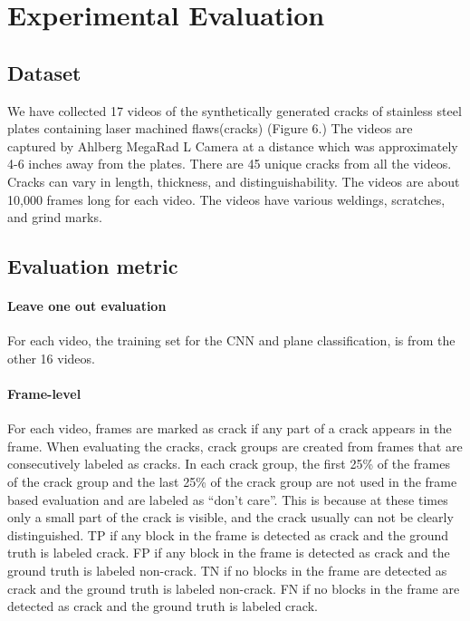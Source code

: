 \section{Experimental Evaluation}

    \subsection{Dataset}
        We have collected 17 videos of the synthetically generated cracks of stainless steel plates containing laser machined flaws(cracks) (Figure 6.) The videos are captured by Ahlberg MegaRad L Camera at a distance which was approximately 4-6 inches away from the plates. There are 45 unique cracks from all the videos. Cracks can vary in length, thickness, and distinguishability. The videos are about 10,000 frames long for each video. The videos have various weldings, scratches, and grind marks.

    \subsection{Evaluation metric}
        \paragraph{Leave one out evaluation}
            For each video, the training set for the CNN and plane classification, is from the other 16 videos.
    
        \paragraph{Frame-level}
            For each video, frames are marked as crack if any part of a crack appears in the frame. When evaluating the cracks,  crack groups are created from frames that are consecutively labeled as cracks.  In each crack group, the first 25\% of the frames of the crack group and the last 25\% of the crack group are not used in the frame based evaluation and are labeled as “don’t care”. This is because at these times only a small part of the crack is visible, and the crack usually can not be clearly distinguished.
                TP if any block in the frame is detected as crack and the ground truth is labeled crack.
                FP if any block in the frame is detected as crack and the ground truth is labeled non-crack.
                TN if no blocks in the frame are detected as crack and the ground truth is labeled non-crack.
                FN if no blocks in the frame are detected as crack and the ground truth is labeled crack.
    
